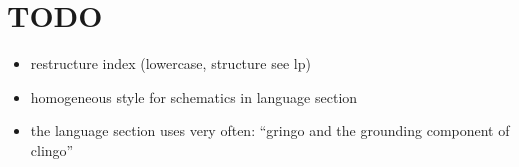 \section{TODO}
\begin{itemize}
\item restructure index (lowercase, structure see lp)
\item homogeneous style for schematics in language section
\item the language section uses very often: ``gringo and the grounding component of clingo''
\end{itemize}


